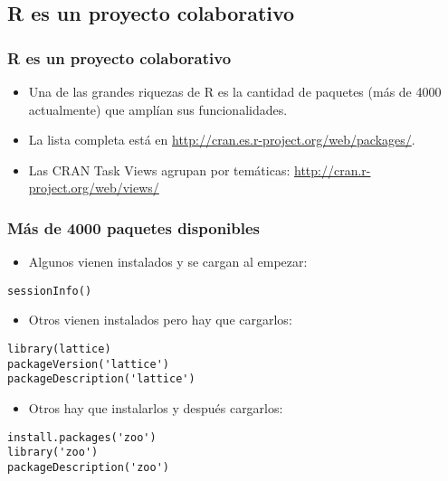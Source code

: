 \documentclass[xcolor={usenames,svgnames,dvipsnames}]{beamer}
\begin{document}
\subsection{R es un proyecto colaborativo}
\label{sec-1-2}
\begin{frame}
\frametitle{R es un proyecto colaborativo}
\label{sec-1-2-1}

\begin{itemize}
\item Una de las grandes riquezas de R es la cantidad de paquetes (más
  de 4000 actualmente) que amplían sus funcionalidades.
\item La lista completa está en \href{http://cran.es.r-project.org/web/packages/}{http://cran.es.r-project.org/web/packages/}.
\item Las CRAN Task Views agrupan por temáticas:
  \href{http://cran.r-project.org/web/views/}{http://cran.r-project.org/web/views/}
\end{itemize}
\end{frame}
\begin{frame}[fragile]
\frametitle{Más de 4000 paquetes disponibles}
\label{sec-1-2-2}

\begin{itemize}
\item Algunos vienen instalados y se cargan al empezar:
\end{itemize}

\lstset{language=R}
\begin{lstlisting}
sessionInfo()
\end{lstlisting}
\begin{itemize}
\item Otros vienen instalados pero hay que cargarlos:
\end{itemize}

\lstset{language=R}
\begin{lstlisting}
library(lattice)
packageVersion('lattice')
packageDescription('lattice')
\end{lstlisting}
\begin{itemize}
\item Otros hay que instalarlos y después cargarlos:
\end{itemize}

\lstset{language=R}
\begin{lstlisting}
install.packages('zoo')
library('zoo')
packageDescription('zoo')
\end{lstlisting}
\end{frame}
\end{document}
